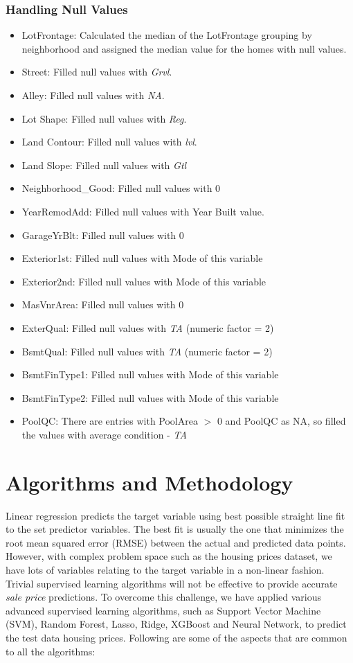 \documentclass[sigconf]{acmart}
\begin{document}
	 \subsubsection{Handling Null Values}
	\begin{itemize}
		\item  LotFrontage: Calculated the median of the LotFrontage grouping by neighborhood and assigned the median value for the homes with null values.
		\item  Street: Filled null values with {\em Grvl}. 
		\item  Alley: Filled null values with {\em NA}. 
		\item  Lot Shape: Filled null values with {\em Reg}. 
		\item  Land Contour: Filled null values with {\em lvl}. 
		\item  Land Slope: Filled null values with {\em Gtl} 
		\item  Neighborhood\_Good: Filled null values with 0
		\item  YearRemodAdd: Filled null values with Year Built value.
		\item  GarageYrBlt: Filled null values with 0
		\item  Exterior1st: Filled null values with Mode of this variable
		\item  Exterior2nd: Filled null values with Mode of this variable
		\item  MasVnrArea: Filled null values with 0
		\item  ExterQual: Filled null values with {\em TA} (numeric factor = 2)
		\item  BsmtQual: Filled null values with {\em TA} (numeric factor = 2)
		\item  BsmtFinType1: Filled null values with Mode of this variable
		\item  BsmtFinType2: Filled null values with Mode of this variable
		\item  PoolQC: There are entries with PoolArea $>$ 0 and PoolQC as NA, so filled the values with average condition - {\em TA}
	\end{itemize}

	\section{Algorithms and Methodology}

	Linear regression predicts the target variable using best possible straight line fit to the set predictor variables. The best fit is usually the one that minimizes the root mean squared error (RMSE) between the actual and predicted data points. However, with complex problem space such as the housing prices dataset, we have lots of variables relating to the target variable in a non-linear fashion. Trivial supervised learning algorithms will not be effective to provide accurate {\em sale price} predictions. To overcome this challenge, we have applied various advanced supervised learning algorithms, such as Support Vector Machine (SVM), Random Forest, Lasso, Ridge, XGBoost and Neural Network, to predict the test data housing prices. Following are some of the aspects that are common to all the algorithms:
	
\end{document}
